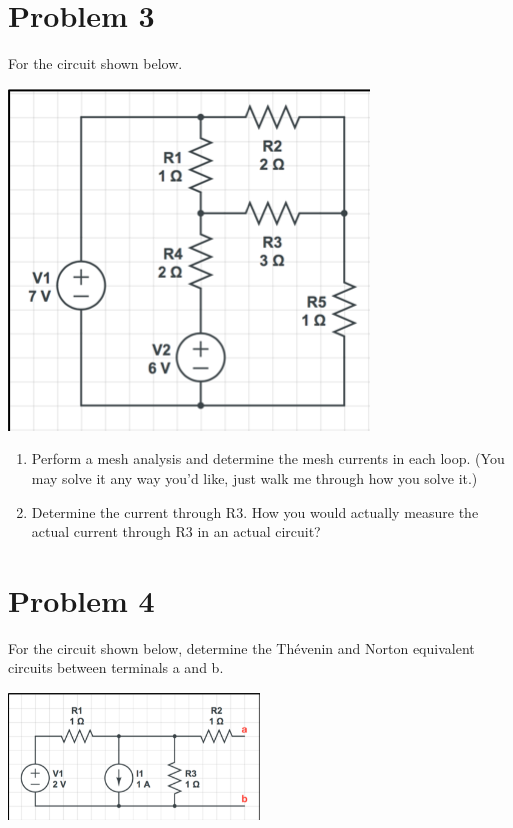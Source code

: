 \documentclass[11pt]{book}
\begin{document}
\section{Problem 3}
For the circuit shown below.
\begin{center}
	\includegraphics{figures/hw2.03.png}
\end{center}
\begin{enumerate}
	\item Perform a mesh analysis and determine the mesh currents in each loop. (You may solve it any way you’d like, just walk me through how you solve it.)
	\item Determine the current through R3. How you would actually measure the actual current through R3 in an actual circuit?
\end{enumerate}



\section{Problem 4}

For the circuit shown below, determine the Thévenin and Norton equivalent circuits between terminals a and b.
\begin{center}
	\includegraphics[width=0.5\textwidth]{figures/hw2.04.png}
\end{center}
\end{document}
